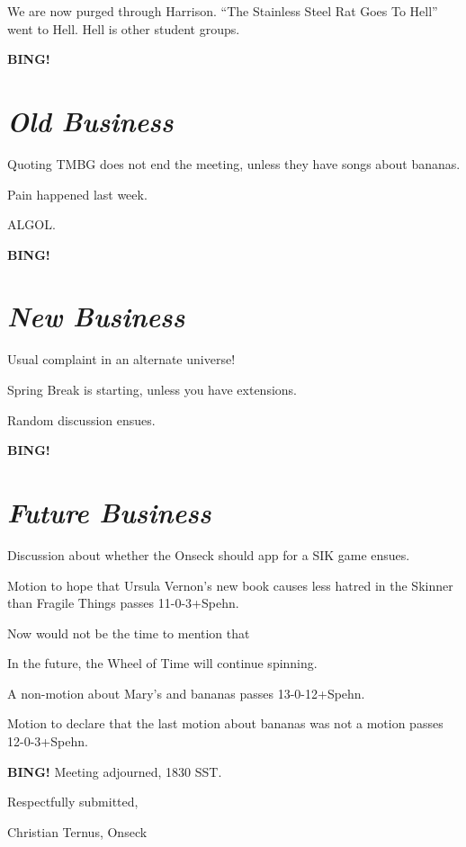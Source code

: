\documentclass[10pt]{article}
\newcommand{\bing}{{\bf BING!} }
\newcommand{\goto}[1]{\bing \vskip 12pt \section*{{\em{#1}}}}
\begin{document}
We are now purged through Harrison.  ``The Stainless Steel Rat Goes To Hell'' went to Hell.
Hell is other student groups.



\goto{Old Business}

Quoting TMBG does not end the meeting, unless they have songs about bananas.

Pain happened last week.

ALGOL.

\goto{New Business}

Usual complaint in an alternate universe!

Spring Break is starting, unless you have extensions.

Random discussion ensues.

\goto{Future Business}

Discussion about whether the Onseck should app for a SIK game ensues.

Motion to hope that Ursula Vernon's new book causes less hatred in the Skinner than Fragile Things passes 11-0-3+Spehn.

Now would not be the time to mention that 

In the future, the Wheel of Time will continue spinning. 

A non-motion about Mary's and bananas passes 13-0-12+Spehn.

Motion to declare that the last motion about bananas was not a motion passes 12-0-3+Spehn. 

\bing
\noindent
Meeting adjourned, 1830 SST.

\vspace{18pt}

\centerline{Respectfully submitted,}
\centerline{Christian Ternus, Onseck}
\end{document}
